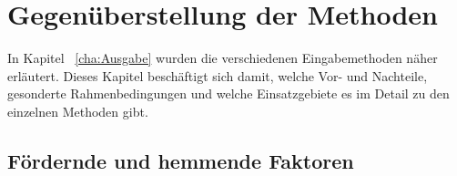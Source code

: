 \chapter{Gegenüberstellung der Methoden}
\label{cha:Vergleich}

In Kapitel ~\ref{cha:Ausgabe} wurden die verschiedenen Eingabemethoden näher erläutert. Dieses Kapitel beschäftigt sich damit, welche Vor- und Nachteile, gesonderte Rahmenbedingungen und welche Einsatzgebiete es im Detail zu den einzelnen Methoden gibt.

\section{Fördernde und hemmende Faktoren}

\begin{landscape}
\begin{longtable}{|p{3cm}|p{3cm}|p{3cm}|p{3cm}|p{3cm}|p{3cm}|}


\end{longtable}
\end{landscape}

